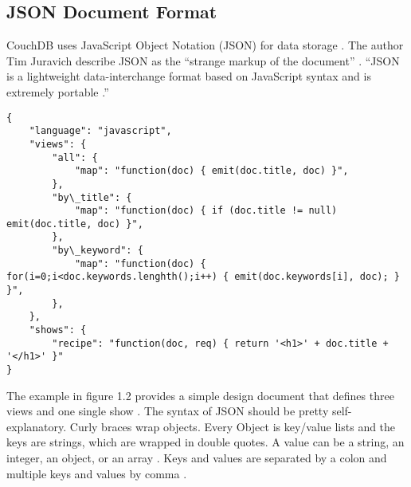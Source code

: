 \subsection{JSON Document Format}
CouchDB uses JavaScript Object Notation (JSON) for data storage \cite{Anderson.2010.Buch}.
The author Tim Juravich describe JSON as the ``strange markup of the document'' \cite{Juravich2012}. ``JSON is a lightweight data-interchange format based on JavaScript syntax and is extremely portable \cite{Juravich2012}.''
\newpage
\begin{lstlisting}[frame=single, caption=Example JSON Document based on \cite{Brown.2012}]
{
    "language": "javascript",
    "views": {
        "all": {
            "map": "function(doc) { emit(doc.title, doc) }",
        },
        "by\_title": {
            "map": "function(doc) { if (doc.title != null) emit(doc.title, doc) }",
        },
        "by\_keyword": {
            "map": "function(doc) { for(i=0;i<doc.keywords.lenghth();i++) { emit(doc.keywords[i], doc); } }",
        },
    },
    "shows": {
        "recipe": "function(doc, req) { return '<h1>' + doc.title + '</h1>' }"
}
\end{lstlisting}
The example in figure 1.2 provides a simple design document that defines three views and one single show \cite{Brown.2012}. The syntax of JSON should be pretty self-explanatory. Curly braces wrap objects. Every Object is key/value lists and the keys are strings, which are wrapped in double quotes. A value can be a string, an integer, an object, or an array \cite{CouchDB.Guide}. Keys and values are separated by a colon and multiple keys and values by comma \cite{CouchDB.Guide}. \\
